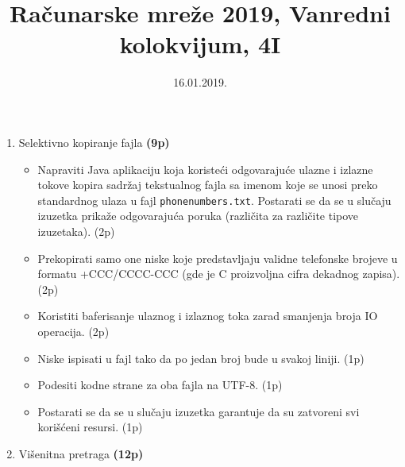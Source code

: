 \documentclass[]{article}
\title{Ra\v{c}unarske mre\v{z}e 2019, Vanredni kolokvijum, 4I}
\author{}
\date{16.01.2019.}
\begin{document}
\maketitle

\begin{enumerate}
  \item Selektivno kopiranje fajla \textbf{(9p)}
  \begin{itemize}
    \item Napraviti Java aplikaciju koja koriste\'c{}i odgovaraju\'c{}e ulazne i izlazne tokove kopira sadr\v{z}aj tekstualnog fajla sa imenom koje se unosi preko standardnog ulaza u fajl \texttt{phonenumbers.txt}. Postarati se da se u slu\v{c}aju izuzetka prika\v{z}e odgovaraju\'c{}a poruka (razli\v{c}ita za razli\v{c}ite tipove izuzetaka). \hfill (2p)
    \item Prekopirati samo one niske koje predstavljaju validne telefonske brojeve u formatu +CCC/CCCC-CCC (gde je C proizvoljna cifra dekadnog zapisa). \hfill (2p)
    \item Koristiti baferisanje ulaznog i izlaznog toka zarad smanjenja broja IO operacija. \hfill (2p)
    \item Niske ispisati u fajl tako da po jedan broj bude u svakoj liniji. \hfill (1p)
    \item Podesiti kodne strane za oba fajla na UTF-8. \hfill (1p)
    \item Postarati se da se u slu\v{c}aju izuzetka garantuje da su zatvoreni svi kori\v{s}\'c{}eni resursi. \hfill (1p)
  \end{itemize}

  \item Vi\v{s}enitna pretraga \textbf{(12p)}


\end{enumerate}
\end{document}
